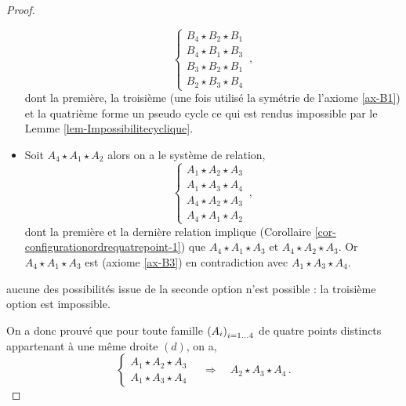 \begin{cor}
\begin{proof}
\begin{itemize}[$\bullet$]
\begin{equation*}
            \left\{
            \begin{array}{c}
                 B_4 \star B_2 \star B_1 \\
                 B_4 \star B_1 \star B_3 \\
                 B_3 \star B_2 \star B_1 \\
                 B_2 \star B_3 \star B_4
            \end{array}
            \right. \,,    
            \end{equation*}
            dont la première, la troisième (une fois utilisé la symétrie de l'axiome \ref{ax-B1}) et la quatrième forme un pseudo cycle ce qui est rendus impossible par le Lemme \ref{lem-Impossibilitecyclique}.
            \item Soit $A_4 \star A_1 \star A_2$ alors on a le système de relation,
            \begin{equation*}
            \left\{
            \begin{array}{c}
                 A_1 \star A_2 \star A_3 \\
                 A_1 \star A_3 \star A_4 \\
                 A_4 \star A_2 \star A_3 \\
                 A_4 \star A_1 \star A_2
            \end{array}
            \right. \,,    
            \end{equation*}
            dont la première et la dernière relation implique (Corollaire \ref{cor-configurationordrequatrepoint-1}) que $A_4 \star A_1 \star A_3$ et $A_4 \star A_2 \star A_3$. Or $A_4 \star A_1 \star A_3$ est (axiome \ref{ax-B3}) en contradiction avec $A_1 \star A_3 \star A_4$. 
        \end{itemize}
        aucune des possibilités issue de la seconde option n'est possible : la troisième option est impossible. 

        On a donc prouvé que pour toute famille $\left(A_{i}\right)_{i = 1\ldots 4}$ de quatre points distincts appartenant à une même droite $(d)$, on a,
        \begin{equation*}
        \left\{
            \begin{array}{c}
                 A_1 \star A_2 \star A_3 \\
                 A_1 \star A_3 \star A_4
            \end{array}
            \right. \quad \Longrightarrow \quad 
                A_2 \star A_3 \star A_4
            \,.
        \end{equation*}
        

\end{proof}
\end{cor}
